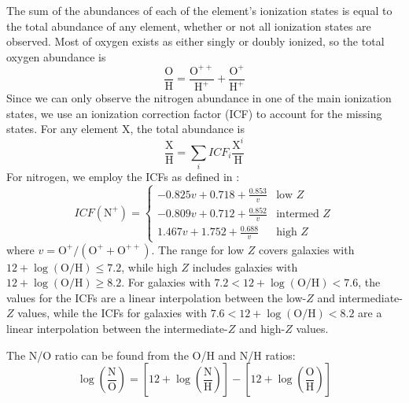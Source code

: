 The sum of the abundances of each of the element's ionization states is equal to 
the total abundance of any element, whether or not all ionization states are 
observed.  Most of oxygen exists as either singly or doubly ionized, so the 
total oxygen abundance is
\begin{equation}
	\frac{\text{O}}{\text{H}} = \frac{\text{O}^{++}}{\text{H}^+} + \frac{\text{O}^+}{\text{H}^+}
\end{equation}
Since we can only observe the nitrogen abundance in one of the main ionization 
states, we use an ionization correction factor (ICF) to account for the missing 
states.  For any element X, the total abundance is 
\begin{equation}\label{eqn:ICF}
    \frac{\text{X}}{\text{H}} = \sum_i ICF_i \frac{\text{X}^i}{\text{H}}
\end{equation}
For nitrogen, we employ the ICFs as defined in \cite{Izotov06}:
\begin{equation}\label{eqn:ICF_N}
    ICF(\text{N}^+) = \left\{ \begin{array}{ll}
    -0.825v + 0.718 + \frac{0.853}{v} & \mbox{low $Z$}\\
    -0.809v + 0.712 + \frac{0.852}{v} & \mbox{intermed $Z$}\\
    1.467v + 1.752 + \frac{0.688}{v} & \mbox{high $Z$}
    \end{array} \right.
\end{equation}
where $v = \text{O}^+ / (\text{O}^+ + \text{O}^{++})$.  The range for low $Z$ 
covers galaxies with $12 + \log \left( \text{O}/\text{H} \right) \leq 7.2$, 
while high $Z$ includes galaxies with 
$12 + \log \left( \text{O}/\text{H} \right) \geq 8.2$.  For galaxies with 
$7.2 < 12 + \log \left( \text{O}/\text{H} \right) < 7.6$, the values for the 
ICFs are a linear interpolation between the low-$Z$ and intermediate-$Z$ values, 
while the ICFs for galaxies with 
$7.6 < 12 + \log \left( \text{O}/\text{H} \right) < 8.2$ are a linear 
interpolation between the intermediate-$Z$ and high-$Z$ values.

The N/O ratio can be found from the O/H and N/H ratios:
\begin{equation}\label{eqn:NO}
    \log \left(\frac{\text{N}}{\text{O}}\right) = \left[ 12 + \log \left( \frac{\text{N}}{\text{H}} \right) \right] - \left[ 12 + \log \left( \frac{\text{O}}{\text{H}} \right) \right]
\end{equation}





